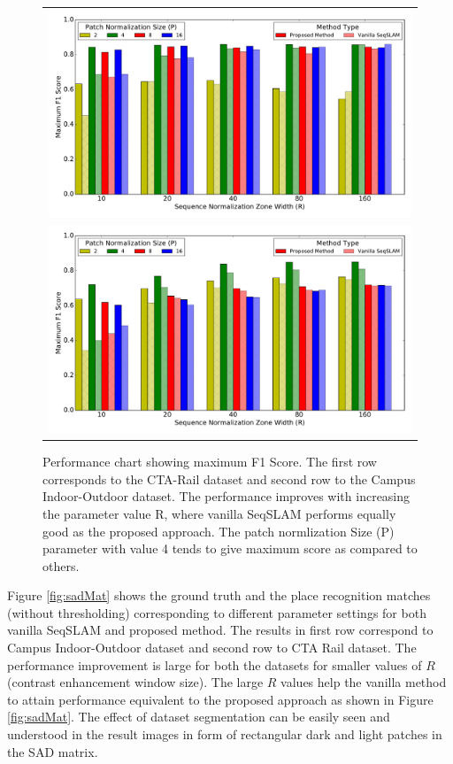 \documentclass[letterpaper, 10 pt, conference]{ieeeconf}  %
\begin{document}
\begin{figure}[t]
\centering
\begin{tabular}[t]{c}
\includegraphics[scale=0.5]{cta-bar-graph}\\
\includegraphics[scale=0.5]{campus-io-bar-graph}
\end{tabular}
 \caption{Performance chart showing maximum F1 Score. The first row corresponds to the CTA-Rail dataset and second row to the Campus Indoor-Outdoor dataset. The performance improves with increasing the parameter value R, where vanilla SeqSLAM performs equally good as the proposed approach. The patch normlization Size (P) parameter with value 4 tends to give maximum score as compared to others.}
 \label{fig:performanceChart}
\end{figure}

Figure \ref{fig:sadMat} shows the ground truth and the place recognition matches (without thresholding) corresponding to different parameter settings for both vanilla SeqSLAM and proposed method. The results in first row correspond to Campus Indoor-Outdoor dataset and second row to CTA Rail dataset. The performance improvement is large for both the datasets for smaller values of $R$ (contrast enhancement window size). The large $R$ values help the vanilla method to attain performance equivalent to the proposed approach as shown in Figure \ref{fig:sadMat}. The effect of dataset segmentation can be easily seen and understood in the result images in form of rectangular dark and light patches in the SAD matrix. 
\end{document}
